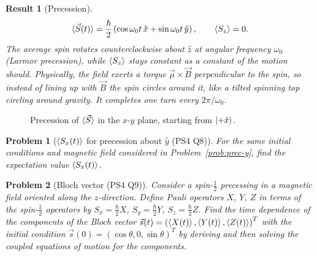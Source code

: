 \documentclass{article}
\newtheorem{problem}{Problem}
\newtheorem{result}{Result}
\begin{document}
\begin{result}[Precession]
    \begin{equation}
        \braket{\vec{S}(t)} = \frac{\hbar}{2}\left(\cos\omega_0t\,\hat{x} + \sin\omega_0t\,\hat{y}\right), \qquad \braket{S_z} = 0.
    \end{equation}
    The average spin rotates counterclockwise about $\hat{z}$ at angular frequency $\omega_0$ (Larmor precession), while $\braket{S_z}$ stays constant as a constant of the motion should. Physically, the field exerts a torque $\vec{\mu}\times\vec{B}$ perpendicular to the spin, so instead of lining up with $\vec{B}$ the spin circles around it, like a tilted spinning top circling around gravity. It completes one turn every $2\pi/\omega_0$.
\end{result}
\begin{figure}[H]
\centering
{}
\caption{Precession of $\braket{\vec{S}}$ in the $x$-$y$ plane, starting from $\ket{+\hat{x}}$.}
\end{figure}
\begin{problem}[$\braket{S_x(t)}$ for precession about $\hat{y}$ (PS4 Q8)]
    For the same initial conditions and magnetic field considered in Problem~\ref{prob:prec-y}, find the expectation value $\braket{S_x(t)}$.
\end{problem}
\begin{problem}[Bloch vector (PS4 Q9)]
    Consider a spin-$\tfrac12$ precessing in a magnetic field oriented along the $z$-direction. Define Pauli operators $X$, $Y$, $Z$ in terms of the spin-$\tfrac12$ operators by $S_x = \frac{\hbar}{2}X$, $S_y = \frac{\hbar}{2}Y$, $S_z = \frac{\hbar}{2}Z$. Find the time dependence of the components of the Bloch vector $\vec{s}(t) = \left(\braket{X(t)}, \braket{Y(t)}, \braket{Z(t)}\right)^T$ with the initial condition $\vec{s}(0) = (\cos\theta, 0, \sin\theta)^T$ by deriving and then solving the coupled equations of motion for the components.
\end{problem}
\end{document}
